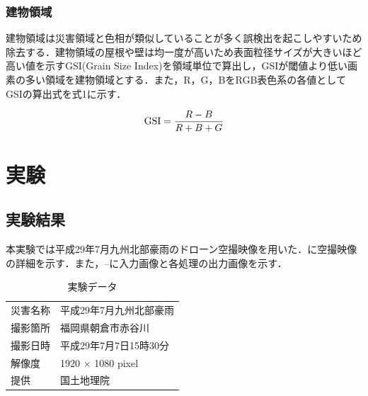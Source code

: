 \documentclass[a4paper, twocolumn, xelatex, 8pt, ja=standard, Ligatures=TeX]{bxjsarticle}
\begin{document}
\subsubsection{建物領域}
	建物領域は災害領域と色相が類似していることが多く誤検出を起こしやすいため除去する．建物領域の屋根や壁は均一度が高いため表面粒径サイズが大きいほど高い値を示すGSI(Grain Size Index)を領域単位で算出し，GSIが閾値より低い画素の多い領域を建物領域とする．また，R，G，BをRGB表色系の各値としてGSIの算出式を式1に示す．

	\begin{equation}
		{\rm GSI} = \frac{R-B}{R+B+G} \nonumber \\
	\end{equation}

\section{実験}
\subsection{実験結果}
	本実験では平成29年7月九州北部豪雨のドローン空撮映像\cite{web01}を用いた．に空撮映像の詳細を示す．また，--に入力画像と各処理の出力画像を示す．
	
	\begin{table}[b]
		\centering
		\caption{実験データ}
		\label{tab03}
		\begin{tabular}{l l}
			\hline
			災害名称 & 平成29年7月九州北部豪雨 \\
			撮影箇所 & 福岡県朝倉市赤谷川 \\
			撮影日時 & 平成29年7月7日15時30分 \\
			解像度 & 1920 × 1080 pixel \\
			提供 & 国土地理院 \\ \hline
		\end{tabular}
	\end{table}
	
\end{document}
